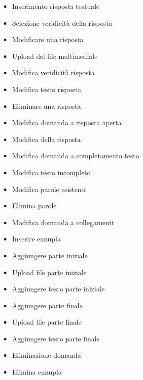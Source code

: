 \begin{itemize}
	\item {} Inserimento risposta testuale
	\item {} Selezione veridicità della risposta
	\item {} Modificare una risposta
	\item {} Upload del file multimediale
	\item {} Modifica veridicità risposta
	\item {} Modifica testo risposta
	\item {} Eliminare una risposta
	\item {} Modifica domanda a risposta aperta 
	\item {} Modifica della risposta 
	\item {} Modifica domanda a completamento testo 
	\item {} Modifica testo incompleto
	\item {} Modifica parole esistenti
	\item {} Elimina parole
	\item {} Modifica domanda a collegamenti
	\item {} Inserire ennupla
	\item {} Aggiungere parte iniziale
	\item {} Upload file parte iniziale 
	\item {} Aggiungere testo parte iniziale
	\item {} Aggiungere parte finale 
	\item {} Upload file parte finale
	\item {} Aggiungere testo parte finale
	\item {} Eliminazione domanda
	\item {} Elimina ennupla
\end{itemize}

